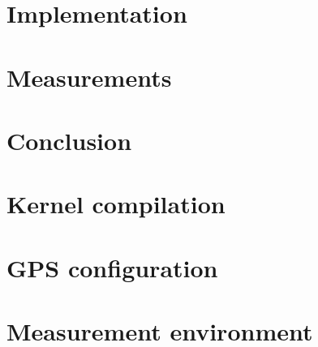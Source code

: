 \chapter{Implementation}
\label{ch:impl}


\chapter{Measurements}
\label{ch:measurements}


\chapter{Conclusion}
\label{ch:conclusion}


\cleardoublepage
{} \setcounter{page}{1}
\printbibliography

\appendix

\chapter{Kernel compilation}
\label{ap:kernel}


\chapter{GPS configuration}
\label{ap:gps}


\chapter{Measurement environment}
\label{ap:environment}



